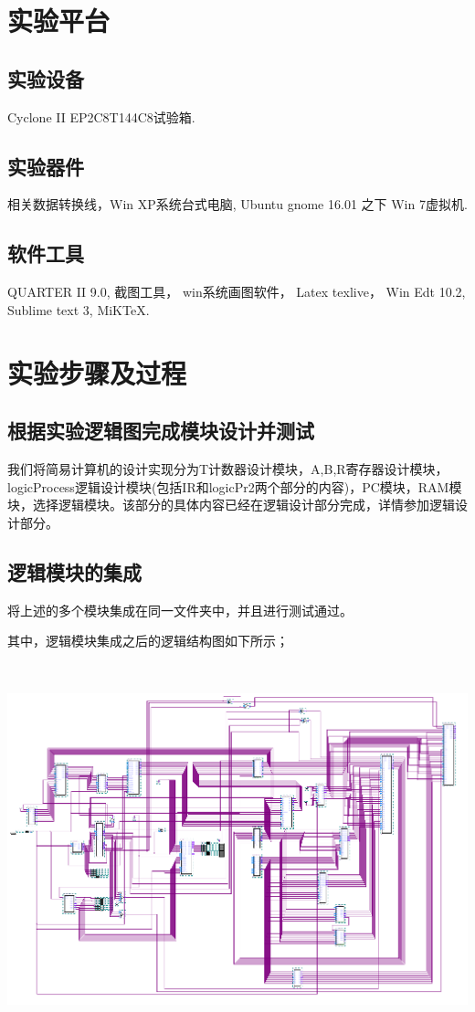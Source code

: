 \documentclass[UTF8]{ctexart}
\begin{document}
    \newpage

    \section{实验平台}
    \subsection{实验设备}
    Cyclone II EP2C8T144C8试验箱.
    \subsection{实验器件}
    相关数据转换线，Win XP系统台式电脑, Ubuntu gnome 16.01 之下  Win 7虚拟机.
    \subsection{软件工具}
    QUARTER II 9.0, 截图工具， win系统画图软件， Latex texlive， Win Edt 10.2,  Sublime text 3, MiKTeX.
    \newpage

    \section{实验步骤及过程}
    \subsection{根据实验逻辑图完成模块设计并测试}
    我们将简易计算机的设计实现分为T计数器设计模块，A,B,R寄存器设计模块，logicProcess逻辑设计模块(包括IR和logicPr2两个部分的内容)，PC模块，RAM模块，选择逻辑模块。该部分的具体内容已经在逻辑设计部分完成，详情参加逻辑设计部分。

    \subsection{逻辑模块的集成}
    将上述的多个模块集成在同一文件夹中，并且进行测试通过。

    其中，逻辑模块集成之后的逻辑结构图如下所示；

    ~

    \includegraphics[width=1.0\textwidth]{./img/总体概览图.png}
\end{document}
